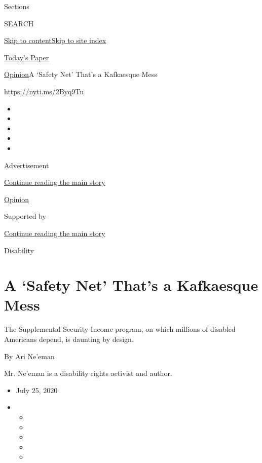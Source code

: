 Sections

SEARCH

\protect\hyperlink{site-content}{Skip to
content}\protect\hyperlink{site-index}{Skip to site index}

\href{https://myaccount.nytimes3xbfgragh.onion/auth/login?response_type=cookie\&client_id=vi}{}

\href{https://www.nytimes3xbfgragh.onion/section/todayspaper}{Today's
Paper}

\href{/section/opinion}{Opinion}\textbar{}A `Safety Net' That's a
Kafkaesque Mess

\url{https://nyti.ms/2Byq9Tu}

\begin{itemize}
\item
\item
\item
\item
\item
\end{itemize}

Advertisement

\protect\hyperlink{after-top}{Continue reading the main story}

\href{/section/opinion}{Opinion}

Supported by

\protect\hyperlink{after-sponsor}{Continue reading the main story}

Disability

\hypertarget{a-safety-net-thats-a-kafkaesque-mess}{%
\section{A `Safety Net' That's a Kafkaesque
Mess}\label{a-safety-net-thats-a-kafkaesque-mess}}

The Supplemental Security Income program, on which millions of disabled
Americans depend, is daunting by design.

By Ari Ne'eman

Mr. Ne'eman is a disability rights activist and author.

\begin{itemize}
\item
  July 25, 2020
\item
  \begin{itemize}
  \item
  \item
  \item
  \item
  \item
  \end{itemize}
\end{itemize}

